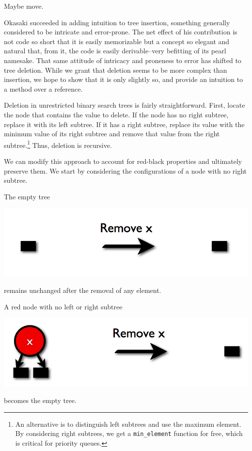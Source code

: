 \documentclass[preprint]{sigplanconf}
\begin{document}
Maybe move.

Okasaki succeeded in adding intuition to tree insertion, something generally considered to be intricate and error-prone. The net effect of his contribution is not code so short that it is easily memorizable but a concept so elegant and natural that, from it, the code is easily derivable--very befitting of its pearl namesake. That same attitude of intricacy and proneness to error has shifted to tree deletion. While we grant that deletion seems to be more complex than insertion, we hope to show that it is only slightly so, and provide an intuition to a method over a reference.

Deletion in unrestricted binary search trees is fairly straightforward. First, locate the node that contains the value to delete. If the node has no right subtree, replace it with its left subtree. If it has a right subtree, replace its value with the minimum value of its right subtree and remove that value from the right subtree.\footnote{An alternative is to distinguish left subtrees and use the maximum element. By considering right subtrees, we get a \texttt{min\_element} function for free, which is critical for priority queues.} Thus, deletion is recursive.

We can modify this approach to account for red-black properties and ultimately preserve them. We start by considering the configurations of a node with no right subtree.

The empty tree
\begin{center}
\includegraphics[scale=0.22]{remove-empty.png}
\end{center}
remains unchanged after the removal of any element.

A red node with no left or right subtree
\begin{center}
\includegraphics[scale=0.22]{remove-single-red.png}
\end{center}
becomes the empty tree.
\end{document}
